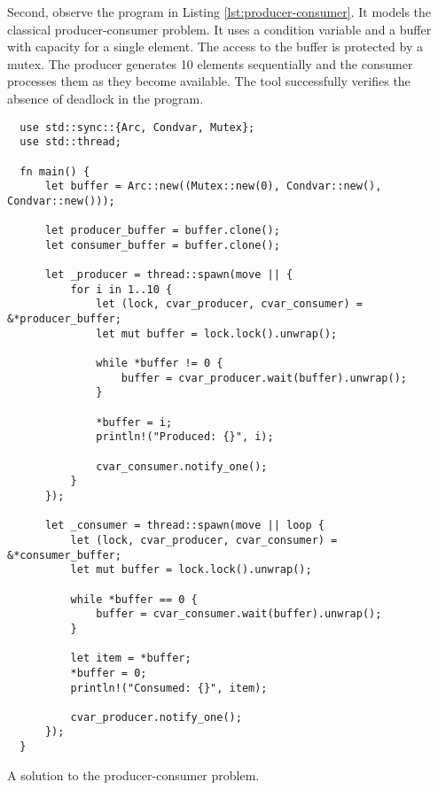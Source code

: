 Second, observe the program in Listing \ref{lst:producer-consumer}.
It models the classical producer-consumer problem.
It uses a condition variable and a buffer with capacity for a single element.
The access to the buffer is protected by a mutex.
The producer generates 10 elements sequentially and
the consumer processes them as they become available.
The tool successfully verifies the absence of deadlock in the program.

\begin{listing}[!htbp]
    \begin{verbatim}
  use std::sync::{Arc, Condvar, Mutex};
  use std::thread;
  
  fn main() {
      let buffer = Arc::new((Mutex::new(0), Condvar::new(), Condvar::new()));
  
      let producer_buffer = buffer.clone();
      let consumer_buffer = buffer.clone();
  
      let _producer = thread::spawn(move || {
          for i in 1..10 {
              let (lock, cvar_producer, cvar_consumer) = &*producer_buffer;
              let mut buffer = lock.lock().unwrap();
  
              while *buffer != 0 {
                  buffer = cvar_producer.wait(buffer).unwrap();
              }
  
              *buffer = i;
              println!("Produced: {}", i);
  
              cvar_consumer.notify_one();
          }
      });
  
      let _consumer = thread::spawn(move || loop {
          let (lock, cvar_producer, cvar_consumer) = &*consumer_buffer;
          let mut buffer = lock.lock().unwrap();
  
          while *buffer == 0 {
              buffer = cvar_consumer.wait(buffer).unwrap();
          }
  
          let item = *buffer;
          *buffer = 0;
          println!("Consumed: {}", item);
  
          cvar_producer.notify_one();
      });
  }
  \end{verbatim}
    \caption{A solution to the producer-consumer problem.}
    \label{lst:producer-consumer}
\end{listing}